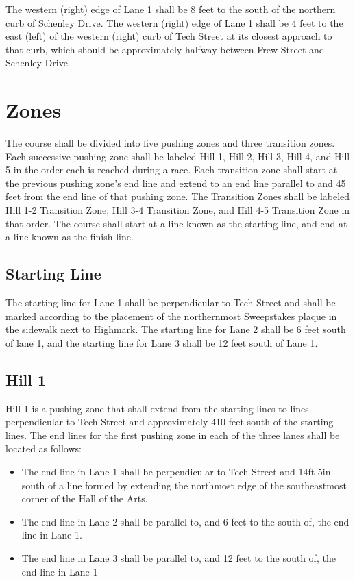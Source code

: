 	The western (right) edge of Lane 1 shall be 8 feet to the south of the northern curb of Schenley Drive. The western (right) edge of Lane 1 shall be 4 feet to the east (left) of the western (right) curb of Tech Street at its closest approach to that curb, which should be approximately halfway between Frew Street and Schenley Drive.

\section{Zones}

	The course shall be divided into five pushing zones and three transition zones. Each successive pushing zone shall be labeled Hill 1, Hill 2, Hill 3, Hill 4, and Hill 5 in the order each is reached during a race. Each transition zone shall start at the previous pushing zone's end line and extend to an end line parallel to and 45 feet from the end line of that pushing zone. The Transition Zones shall be labeled Hill 1-2 Transition Zone, Hill 3-4 Transition Zone, and Hill 4-5 Transition Zone in that order. The course shall start at a line known as the starting line, and end at a line known as the finish line.

\subsection{Starting Line}

	The starting line for Lane 1 shall be perpendicular to Tech Street and shall be marked according to the placement of the northernmost Sweepstakes plaque in the sidewalk next to Highmark. The starting line for Lane 2 shall be 6 feet south of lane 1, and the starting line for Lane 3 shall be 12 feet south of Lane 1.

\subsection{Hill 1}

	Hill 1 is a pushing zone that shall extend from the starting lines to lines perpendicular to Tech Street and approximately 410 feet south of the starting lines. The end lines for the first pushing zone in each of the three lanes shall be located as follows:

	\begin{itemize}
	
		\item
		The end line in Lane 1 shall be perpendicular to Tech Street and 14ft 5in south of a line formed by extending the northmost edge of the southeastmost corner of the Hall of the Arts.

		\item
		The end line in Lane 2 shall be parallel to, and 6 feet to the south of, the end line in Lane 1.
		
		\item
		The end line in Lane 3 shall be parallel to, and 12 feet to the south of, the end line in Lane 1

	\end{itemize}

